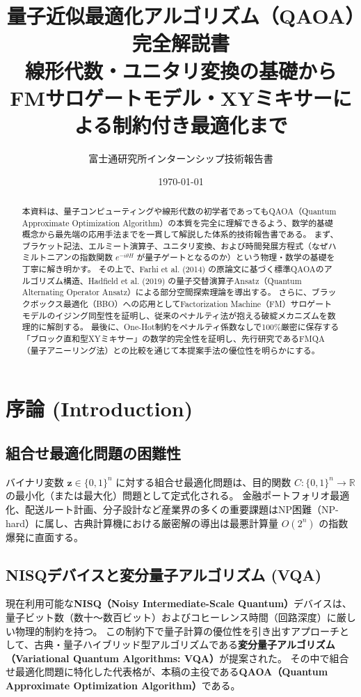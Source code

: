 \documentclass[11pt,a4paper]{ltjsarticle}
\title{\Huge\bfseries 量子近似最適化アルゴリズム（QAOA）完全解説書\\
\Large 線形代数・ユニタリ変換の基礎から\\
FMサロゲートモデル・XYミキサーによる制約付き最適化まで}
\author{\Large 富士通研究所インターンシップ技術報告書}
\date{\large \today}
\theoremstyle{definition}
\theoremstyle{plain}
\theoremstyle{remark}
\begin{document}
\maketitle

\begin{abstract}
本資料は、量子コンピューティングや線形代数の初学者であってもQAOA（Quantum Approximate Optimization Algorithm）の本質を完全に理解できるよう、数学的基礎概念から最先端の応用手法までを一貫して解説した体系的技術報告書である。
まず、ブラケット記法、エルミート演算子、ユニタリ変換、および時間発展方程式（なぜハミルトニアンの指数関数 $e^{-i\theta H}$ が量子ゲートとなるのか）という物理・数学の基礎を丁寧に解き明かす。
その上で、Farhi et al. (2014) の原論文に基づく標準QAOAのアルゴリズム構造、Hadfield et al. (2019) の量子交替演算子Ansatz（Quantum Alternating Operator Ansatz）による部分空間探索理論を導出する。
さらに、ブラックボックス最適化（BBO）への応用としてFactorization Machine（FM）サロゲートモデルのイジング同型性を証明し、従来のペナルティ法が抱える破綻メカニズムを数理的に解剖する。
最後に、One-Hot制約をペナルティ係数なしで100\%厳密に保存する「ブロック直和型XYミキサー」の数学的完全性を証明し、先行研究であるFMQA（量子アニーリング法）との比較を通じて本提案手法の優位性を明らかにする。
\end{abstract}

\tableofcontents
\newpage

\section{序論 (Introduction)}

\subsection{組合せ最適化問題の困難性}
バイナリ変数 $\bm{z} \in \{0, 1\}^n$ に対する組合せ最適化問題は、目的関数 $C: \{0, 1\}^n \to \mathbb{R}$ の最小化（または最大化）問題として定式化される。
金融ポートフォリオ最適化、配送ルート計画、分子設計など産業界の多くの重要課題はNP困難（NP-hard）に属し、古典計算機における厳密解の導出は最悪計算量 $O(2^n)$ の指数爆発に直面する。

\subsection{NISQデバイスと変分量子アルゴリズム (VQA)}
現在利用可能な\textbf{NISQ（Noisy Intermediate-Scale Quantum）}デバイスは、量子ビット数（数十〜数百ビット）およびコヒーレンス時間（回路深度）に厳しい物理的制約を持つ。
この制約下で量子計算の優位性を引き出すアプローチとして、古典・量子ハイブリッド型アルゴリズムである\textbf{変分量子アルゴリズム（Variational Quantum Algorithms: VQA）}が提案された。
その中で組合せ最適化問題に特化した代表格が、本稿の主役である\textbf{QAOA（Quantum Approximate Optimization Algorithm）}である。
\end{document}
